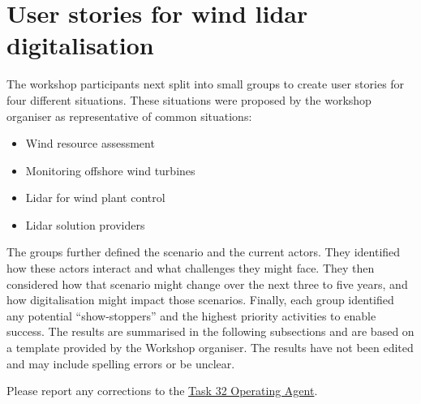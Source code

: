 \section{User stories for wind lidar digitalisation}

The workshop participants next split into small groups to create user stories for four different situations. These situations were proposed by the workshop organiser as representative of common situations:
\begin{itemize}
\item Wind resource assessment
\item Monitoring offshore wind turbines
\item Lidar for wind plant control
\item Lidar solution providers
\end{itemize}

The groups further defined the scenario and the current actors. They identified how these actors interact and what challenges they might face. They then considered how that scenario might change over the next three to five years, and how digitalisation might impact those scenarios. Finally, each group identified any potential “show-stoppers” and the highest priority activities to enable success. The results are summarised in the following subsections and are based on a template provided by the Workshop organiser. The results have not been edited and may include spelling errors or be unclear.

\begin{taskactions}
    Please report any corrections to the \href{mailto:ieawind.task32@ifb.uni-stuttgart.de}{Task 32 Operating Agent}.
\end{taskactions}